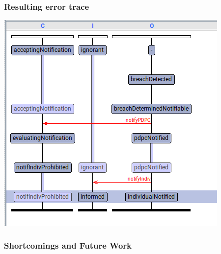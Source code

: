 \documentclass{beamer}
\begin{document}
\begin{frame}[fragile]\frametitle{Resulting error trace}

  \begin{center}
    \includegraphics[scale=0.6]{Figures/uppaal_swimlane.png}
  \end{center}

\end{frame}

\begin{frame}[fragile]\frametitle{Shortcomings and Future Work}


\end{frame}
\end{document}
